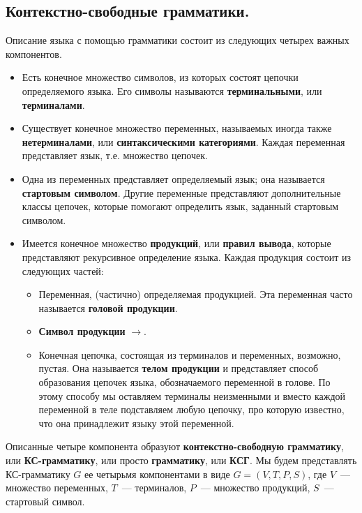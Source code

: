 \documentclass[a4paper,12pt]{article}
\begin{document}
	\subsection{Контекстно-свободные грамматики.}
	Описание языка с помощью грамматики состоит из следующих четырех важных компонентов.
	\begin{itemize}
		\item Есть конечное множество символов, из которых состоят цепочки определяемого языка. Его символы называются \textbf{терминальными}, или \textbf{терминалами}.
		
		\item Существует конечное множество переменных, называемых иногда также \textbf{нетерминалами}, или \textbf{синтаксическими категориями}. Каждая переменная представляет язык, т.е. множество цепочек.
		
		\item Одна из переменных представляет определяемый язык; она называется \textbf{стартовым символом}. Другие переменные представляют дополнительные классы цепочек, которые помогают определить язык, заданный стартовым символом.
		
		\item Имеется конечное множество \textbf{продукций}, или \textbf{правил вывода}, которые представляют рекурсивное определение языка. Каждая продукция состоит из следующих частей:
		\begin{itemize}
			\item Переменная, (частично) определяемая продукцией. Эта переменная часто называется \textbf{головой продукции}.
			\item \textbf{Символ продукции} \(\to\).
			\item Конечная цепочка, состоящая из терминалов и переменных, возможно, пустая. Она называется \textbf{телом продукции} и представляет способ образования цепочек языка, обозначаемого переменной в голове. По этому способу мы оставляем терминалы неизменными и вместо каждой переменной в теле подставляем любую цепочку, про которую известно, что она принадлежит языку этой переменной.
		\end{itemize}
	\end{itemize}
	Описанные четыре компонента образуют \textbf{контекстно-свободную грамматику}, или \textbf{КС-грамматику}, или просто \textbf{грамматику}, или \textbf{КСГ}. Мы будем представлять КС-грамматику \(G\) ее четырьмя компонентами в виде \(G = (V, T, P, S)\), где \(V\)~--- множество переменных, \(T\)~--- терминалов, \(P\)~--- множество продукций, \(S\)~--- стартовый символ.
	
\end{document}
